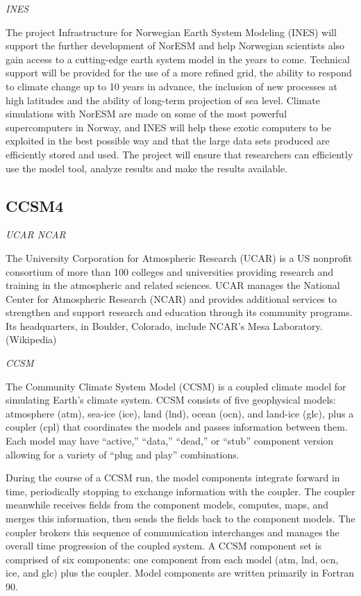 \documentclass[
]{book}
\begin{document}
\emph{INES}

The project Infrastructure for Norwegian Earth System Modeling (INES) will support the further development of NorESM and help Norwegian scientists also gain access to a cutting-edge earth system model in the years to come. Technical support will be provided for the use of a more refined grid, the ability to respond to climate change up to 10 years in advance, the inclusion of new processes at high latitudes and the ability of long-term projection of sea level.
Climate simulations with NorESM are made on some of the most powerful supercomputers in Norway, and INES will help these exotic computers to be exploited in the best possible way and that the large data sets produced are efficiently stored and used. The project will ensure that researchers can efficiently use the model tool, analyze results and make the results available.

\hypertarget{ccsm4}{%
\subsection{CCSM4}\label{ccsm4}}

\emph{UCAR NCAR}

The University Corporation for Atmospheric Research (UCAR) is a
US nonprofit consortium of more than 100 colleges and universities providing
research and training in the atmospheric and related sciences.
UCAR manages the National Center for Atmospheric Research (NCAR) and
provides additional services to strengthen and support research and education
through its community programs.
Its headquarters, in Boulder, Colorado, include NCAR's Mesa Laboratory. (Wikipedia)

\emph{CCSM}

The Community Climate System Model (CCSM) is a
coupled climate model for simulating Earth's climate system.
CCSM consists of five geophysical models:
atmosphere (atm), sea-ice (ice), land (lnd), ocean (ocn), and land-ice (glc),
plus a coupler (cpl) that coordinates the models and passes information between them.
Each model may have ``active,'' ``data,'' ``dead,'' or ``stub'' component version allowing
for a variety of ``plug and play'' combinations.

During the course of a CCSM run, the model components integrate forward in time, periodically stopping to exchange information with the coupler. The coupler meanwhile receives fields from the component models, computes, maps, and merges this information, then sends the fields back to the component models. The coupler brokers this sequence of communication interchanges and manages the overall time progression of the coupled system. A CCSM component set is comprised of six components: one component from each model (atm, lnd, ocn, ice, and glc) plus the coupler. Model components are written primarily in Fortran 90.
\end{document}
